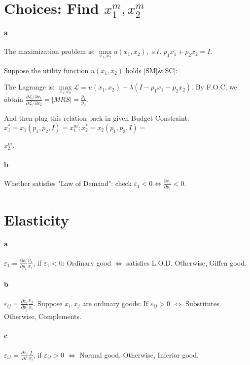 \documentclass{article} %
\begin{document}
\section{Choices: Find $x_1^m, x_2^m$} %
\paragraph{a}
    The maximization problem is: $\mathop{max}\limits_{x_1,x_2} u(x_1,x_2),$  $s.t.$  $p_1x_1+p_2x_2=I$. 
    
    Suppose the utility function $u(x_1,x_2)$ holds [SM]\&[SC]:
    
    The Lagrange is: $\mathop{max}\limits_{x_1,x_2} \mathcal{L}= u(x_1,x_2)+\lambda(I - p_1x_1 - p_2x_2)$. By F.O.C, we obtain $\frac{\partial \mathcal{L}/\partial x_1}{\partial \mathcal{L}/\partial x_2}=|MRS|=\frac{p_1}{p_2}$. 
    
    And then plug this relation back in given Budget Constraint: $x_1^*=x_1(p_1,p_2,I)=x_1^m; x_2^*=x_2(p_1,p_2,I)= $
    
   $ x_2^m$.
    

\paragraph{b}
    Whether satisfies "Law of Demand": check $\varepsilon_1<0 \Leftrightarrow \frac{\partial x_1}{\partial p_1}<0$.
    \\

\section{Elasticity} %
\paragraph{a}
    $\varepsilon_1 = \frac{\partial x_1}{\partial p_1}\frac{p_1}{x_1}$, if $\varepsilon_1<0$: Ordinary good $\Leftrightarrow$ satisfies L.O.D. Otherwise, Giffen good.
    


\paragraph{b} 
    $\varepsilon_{ij} = \frac{\partial x_i}{\partial p_j}\frac{p_j}{x_i}$. Suppose $x_i, x_j$ are ordinary goods: If $\varepsilon_{ij}>0$ $\Leftrightarrow$ Substitutes. Otherwise, Complements.
    
\paragraph{c}
    $\varepsilon_{iI} = \frac{\partial x_i}{\partial I}\frac{I}{x_i}$, if $\varepsilon_{iI}>0$ $\Leftrightarrow$ Normal good. Otherwise, Inferior good.
    \\
\end{document}
